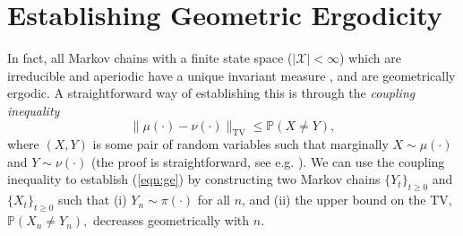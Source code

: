 \documentclass{article}
\newcommand{\TV}{\text{TV}}
\begin{document}
\section{Establishing Geometric Ergodicity}

In fact, all Markov chains with a finite state space ($|\mathcal{X}| < \infty$) which are irreducible and aperiodic have a unique invariant measure \cite{Norris_1997}, and are geometrically ergodic.  A straightforward way of establishing this is through the \emph{coupling inequality}
\begin{equation}
\|\mu(\cdot) - \nu(\cdot)\|_{\TV} \leq \mathbb{P}(X \neq Y),
\end{equation}
where $(X,Y)$ is some pair of random variables such that marginally $X \sim \mu(\cdot)$ and $Y \sim \nu(\cdot)$ (the proof is straightforward, see e.g. \cite{2004}).  We can use the coupling inequality to establish (\ref{eqn:ge}) by constructing two Markov chains $\{Y_t\}_{t \geq 0}$ and $\{ X_t\}_{t \geq 0}$ such that (i) $Y_n \sim \pi(\cdot)$ for all $n$, and (ii) the upper bound on the TV, $\mathbb{P}(X_n \neq Y_n),$ decreases geometrically with $n$. 
\end{document}
